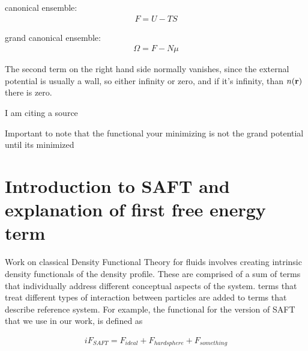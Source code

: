 canonical ensemble:
\begin{align}
  F = U - TS
\end{align}


grand canonical ensemble:
\begin{align}
  \Omega = F - N \mu
\end{align}

The second term on the right hand side normally vanishes, since the
external potential is usually a wall, so either infinity or zero, and
if it's infinity, than $n(\textbf{r})$ there is zero.







I am citing a source~\cite{huang2003dynamic}
\clearpage
\newpage

Important to note that the functional your minimizing is not the grand potential until its minimized



\section{Introduction to SAFT and explanation of first free energy term}


Work on classical Density Functional Theory for fluids involves
creating intrinsic density functionals of the density profile.  These
are comprised of a sum of terms that individually address different
conceptual aspects of the system.   terms that treat different types
of interaction between particles are added to terms that describe
reference system.  For example, the functional for the version of SAFT
that we use in our work, is defined as

\begin{align}
  iF_{SAFT} = F_{ideal} + F_{hard sphere} + F_{something}
\end{align}

